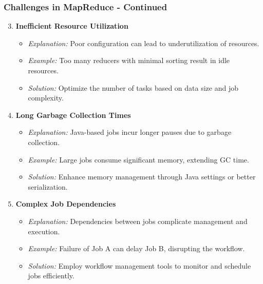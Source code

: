 \documentclass[aspectratio=169]{beamer}
\begin{document}
\begin{frame}[fragile]
    \frametitle{Challenges in MapReduce - Continued}
    \begin{enumerate}
        \setcounter{enumi}{2}
        \item \textbf{Inefficient Resource Utilization}
        \begin{itemize}
            \item \textit{Explanation:} Poor configuration can lead to underutilization of resources.
            \item \textit{Example:} Too many reducers with minimal sorting result in idle resources.
            \item \textit{Solution:} Optimize the number of tasks based on data size and job complexity.
        \end{itemize}
        
        \item \textbf{Long Garbage Collection Times}
        \begin{itemize}
            \item \textit{Explanation:} Java-based jobs incur longer pauses due to garbage collection.
            \item \textit{Example:} Large jobs consume significant memory, extending GC time.
            \item \textit{Solution:} Enhance memory management through Java settings or better serialization.
        \end{itemize}
        
        \item \textbf{Complex Job Dependencies}
        \begin{itemize}
            \item \textit{Explanation:} Dependencies between jobs complicate management and execution.
            \item \textit{Example:} Failure of Job A can delay Job B, disrupting the workflow.
            \item \textit{Solution:} Employ workflow management tools to monitor and schedule jobs efficiently.
        \end{itemize}
    \end{enumerate}
\end{frame}
\end{document}
